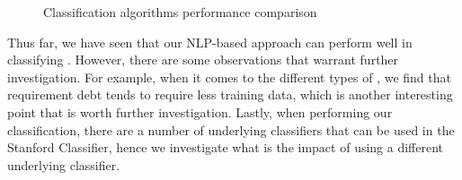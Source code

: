 \begin{figure}[!thb]
  \centering
  \caption{Classification algorithms performance comparison}
  \label{fig:algorithms_comparison}
\end{figure}

Thus far, we have seen that our NLP-based approach can perform well in classifying \SATD. However, there are some observations that warrant further investigation. For example, when it comes to the different types of \SATD, we find that requirement debt tends to require less training data, which is another interesting point that is worth further investigation. Lastly, when performing our classification, there are a number of underlying classifiers that can be used in the Stanford Classifier, hence we investigate what is the impact of using a different underlying classifier. 

